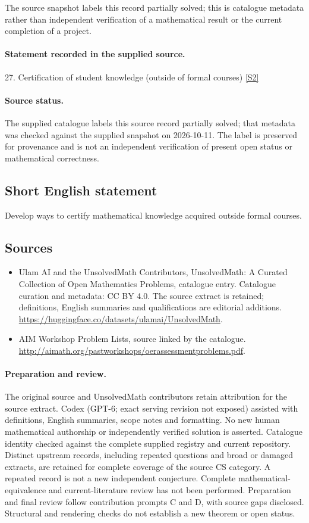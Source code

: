 \documentclass[11pt]{article}
\begin{document}
The source snapshot labels this record partially solved; this is catalogue metadata rather than independent verification of a mathematical result or the current completion of a project.
\paragraph{Statement recorded in the supplied source.}
27. Certification of student knowledge (outside of formal courses) \href{http://aimath.org/pastworkshops/oerassessmentproblems.pdf}{[S2]}
\paragraph{Source status.}
The supplied catalogue labels this source record partially solved; that metadata was checked against the supplied snapshot on 2026-10-11. The label is preserved for provenance and is not an independent verification of present open status or mathematical correctness.
\subsection{Short English statement}
Develop ways to certify mathematical knowledge acquired outside formal courses.
\subsection{Sources}
\begin{itemize}
\item[S1] Ulam AI and the UnsolvedMath Contributors, UnsolvedMath: A Curated Collection of Open Mathematics Problems, catalogue entry. Catalogue curation and metadata: CC BY 4.0. The source extract is retained; definitions, English summaries and qualifications are editorial additions.
\url{https://huggingface.co/datasets/ulamai/UnsolvedMath}.
\item[S2] AIM Workshop Problem Lists, source linked by the catalogue.
\url{http://aimath.org/pastworkshops/oerassessmentproblems.pdf}.
\end{itemize}
\paragraph{Preparation and review.}
The original source and UnsolvedMath contributors retain attribution for the source extract. Codex (GPT-6; exact serving revision not exposed) assisted with definitions, English summaries, scope notes and formatting. No new human mathematical authorship or independently verified solution is asserted. Catalogue identity checked against the complete supplied registry and current repository. Distinct upstream records, including repeated questions and broad or damaged extracts, are retained for complete coverage of the source CS category. A repeated record is not a new independent conjecture. Complete mathematical-equivalence and current-literature review has not been performed. Preparation and final review follow contribution prompts C and D, with source gaps disclosed. Structural and rendering checks do not establish a new theorem or open status.
\label{end:statement}
\end{document}
